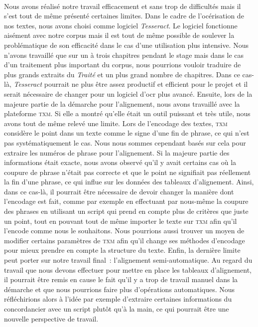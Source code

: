 \paragraph{} Nous avons réalisé notre travail efficacement et sans trop de difficultés mais il s'est tout de même présenté certaines limites. Dans le cadre de l'océrisation de nos textes, nous avons choisi comme logiciel \emph{Tesseract}. Le logiciel fonctionne aisément avec notre corpus mais il est tout de même possible de soulever la problématique de son efficacité dans le cas d'une utilisation plus intensive. Nous n'avons travaillé que sur un à trois chapitres pendant le stage mais dans le cas d'un traitement plus important du corpus, nous pourrions vouloir traduire de plus grands extraits du \emph{Traité} et un plus grand nombre de chapitres. Dans ce cas-là, \emph{Tesseract} pourrait ne plus être assez productif et efficient pour le projet et il serait nécessaire de changer pour un logiciel d'\acrshort{ocr} plus avancé. Ensuite, lors de la majeure partie de la démarche pour l'alignement, nous avons travaillé avec la plateforme \textsc{txm}. Si elle a montré qu'elle était un outil puissant et très utile, nous avons tout de même relevé une limite. Lors de l'encodage des textes, \textsc{txm} considère le point dans un texte comme le signe d'une fin de phrase, ce qui n'est pas systématiquement le cas. Nous nous sommes cependant basés sur cela pour extraire les numéros de phrase pour l'alignement. Si la majeure partie des informations était exacte, nous avons observé qu'il y avait certains cas où la coupure de phrase n'était pas correcte et que le point ne signifiait pas réellement la fin d'une phrase, ce qui influe sur les données des tableaux d'alignement. Ainsi, dans ce cas-là, il pourrait être nécessaire de devoir changer la manière dont l'encodage est fait, comme par exemple en effectuant par nous-même la coupure des phrases en utilisant un script qui prend en compte plus de critères que juste un point, tout en pouvant tout de même importer le texte sur \textsc{txm} afin qu'il l'encode comme nous le souhaitons. Nous pourrions aussi trouver un moyen de modifier certains paramètres de \textsc{txm} afin qu'il change ses méthodes d'encodage pour mieux prendre en compte la structure du texte. Enfin, la dernière limite peut porter sur notre travail final~: l'alignement semi-automatique. Au regard du travail que nous devons effectuer pour mettre en place les tableaux d'alignement, il pourrait être remis en cause le fait qu'il y a trop de travail manuel dans la démarche et que nous pourrions faire plus d'opérations automatiques. Nous réfléchirions alors à l'idée par exemple d'extraire certaines informations du concordancier avec un script plutôt qu'à la main, ce qui pourrait être une nouvelle perspective de travail.

